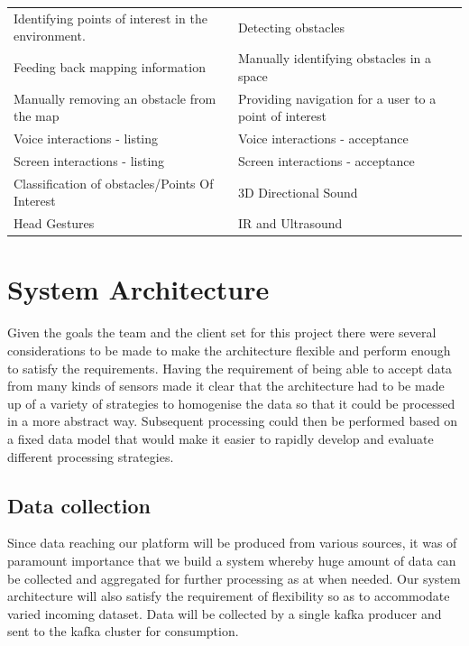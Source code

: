 \documentclass[prodmode,acmtosem]{acmsmall} %
\begin{document}
\renewcommand{\arraystretch}{1.5}

\begin{center}
\begin{tabularx}{\textwidth}{| X | X |} 
 \hline
 \rowcolor{lightgray}
 \multicolumn{2}{|c|}{List of Requirements} \\ [0.5ex] 
 \hline\hline
 Identifying points of interest in the environment. &  Detecting obstacles \\
 \hline
 Feeding back mapping information &  Manually identifying obstacles in a space \\
 \hline
 Manually removing an obstacle from the map &  Providing navigation for a user to a point of interest \\ 
 \hline
 Voice interactions - listing &  Voice interactions - acceptance \\ 
 \hline
 Screen interactions - listing &  Screen interactions - acceptance \\ 
 \hline
 Classification of obstacles/Points Of Interest &  3D Directional Sound \\ 
 \hline
 Head Gestures &  IR and Ultrasound \\  
 \hline

 \hline
\end{tabularx}
\label{table:requirements}
\end{center}

\section{System Architecture}
\label{architecture}
Given the goals the team and the client set for this project there were several considerations to be made to make the architecture flexible and perform enough to satisfy the requirements. Having the requirement of being able to accept data from many kinds of sensors made it clear that the architecture had to be made up of a variety of strategies to homogenise the data so that it could be processed in a more abstract way. Subsequent processing could then be performed based on a fixed data model that would make it easier to rapidly develop and evaluate different processing strategies.

\subsection{Data collection}
Since data reaching our platform will be produced from various sources, it was of paramount importance that we build a system whereby huge amount of data can be collected and aggregated for further processing as at when needed. Our system architecture will also satisfy the requirement of flexibility so as to accommodate varied incoming dataset. Data will be collected by a single kafka producer and sent to the kafka cluster for consumption.
\end{document}
